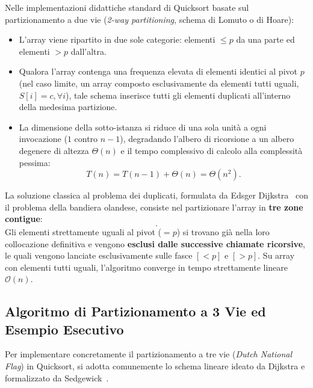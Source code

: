 Nelle implementazioni didattiche standard di Quicksort basate sul partizionamento a due vie (\textit{2-way partitioning}, schema di Lomuto o di Hoare):
\begin{itemize}
  \item L'array viene ripartito in due sole categorie: elementi $\le p$ da una parte ed elementi $> p$ dall'altra.
  \item Qualora l'array contenga una frequenza elevata di elementi identici al pivot $p$ (nel caso limite, un array composto esclusivamente da elementi tutti uguali, $S[i] = c, \forall i$), tale schema inserisce tutti gli elementi duplicati all'interno della medesima partizione.
  \item La dimensione della sotto-istanza si riduce di una sola unità a ogni invocazione ($1$ contro $n-1$), degradando l'albero di ricorsione a un albero degenere di altezza $\Theta(n)$ e il tempo complessivo di calcolo alla complessità pessima:
  \begin{equation}
    T(n) = T(n - 1) + \Theta(n) = \Theta(n^2).
  \end{equation}
\end{itemize}

\begin{definition}
La soluzione classica al problema dei duplicati, formulata da Edsger Dijkstra~\cite{dijkstra1976} con il problema della bandiera olandese, consiste nel partizionare l'array in \textbf{tre zone contigue}:
\begin{equation}
  [\, < p \quad \mid \quad = p \quad \mid \quad > p \,].
\end{equation}
Gli elementi strettamente uguali al pivot ($= p$) si trovano già nella loro collocazione definitiva e vengono \textbf{esclusi dalle successive chiamate ricorsive}, le quali vengono lanciate esclusivamente sulle fasce $[< p]$ e $[> p]$. Su array con elementi tutti uguali, l'algoritmo converge in tempo strettamente lineare $\mathcal{O}(n)$.
\end{definition}

\subsection{Algoritmo di Partizionamento a 3 Vie ed Esempio Esecutivo}
\label{subsec:3way-quicksort-example}

Per implementare concretamente il partizionamento a tre vie (\textit{Dutch National Flag}) in Quicksort, si adotta comunemente lo schema lineare ideato da Dijkstra e formalizzato da Sedgewick~\cite{sedgewick1978}. 

